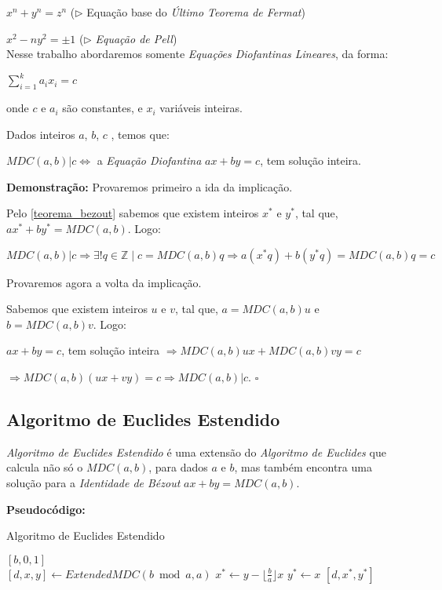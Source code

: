 $x^n + y^n = z^n$ ($\triangleright$ Equação base do \textit{Último Teorema de Fermat})

$x^2 - ny^2 = \pm 1$ ($\triangleright$ \textit{Equação de Pell})\\



Nesse trabalho abordaremos somente \textit{Equações Diofantinas Lineares}, da forma:

$\sum_{i=1}^{k}a_i x_i = c$

onde $c$ e $a_i$ são constantes, e $x_i$ variáveis inteiras.\\


\begin{theorem}\label{equacao_diofantina_implicacao}
Dados inteiros $a$, $b$, $c$ , temos que:

$MDC(a,b)|c \Leftrightarrow$ a \textit{Equação Diofantina} $ax + by=c$, tem solução inteira.
\end{theorem}
\textbf{Demonstração:}
Provaremos primeiro a ida da implicação.

Pelo \autoref{teorema_bezout} sabemos que existem inteiros $x^*$ e $y^*$, tal que, $ax^* + by^* = MDC(a,b)$. Logo:

$MDC(a,b)|c \Rightarrow \exists! q\in\mathbb{Z} \mid c = MDC(a,b)q \Rightarrow a(x^*q) + b(y^*q) = MDC(a,b)q = c$ 

Provaremos agora a volta da implicação.

Sabemos que existem inteiros $u$ e $v$, tal que, $a=MDC(a,b)u$ e $b=MDC(a,b)v$. Logo:

$ax + by=c$, tem solução inteira $\Rightarrow MDC(a,b)ux + MDC(a,b)vy = c$

$\Rightarrow MDC(a,b)(ux + vy) = c \Rightarrow MDC(a,b)|c$. $\square$ 



\subsection{Algoritmo de Euclides Estendido}

\textit{Algoritmo de Euclides Estendido} é uma extensão do \textit{Algoritmo de Euclides} que calcula não só o $MDC(a,b)$, para dados $a$ e $b$, mas também encontra
uma solução para a \textit{Identidade de Bézout} $ax+by = MDC(a,b)$. 
\clearpage

\textbf{Pseudocódigo:}
\begin{algorithm}
\caption{Algoritmo de Euclides Estendido}\label{mdc_extended}
\begin{algorithmic}[1]
\State \Return $[b,0,1]$
\EndIf
\\
\State $[d,x,y] \gets ExtendedMDC(b \bmod a, a)$
\State $x^* \gets y - \lfloor \frac{b}{a} \rfloor x$
\State $y^* \gets x$
\State \Return $[d,x^*,y^*]$
\EndProcedure
\end{algorithmic}
\end{algorithm}

